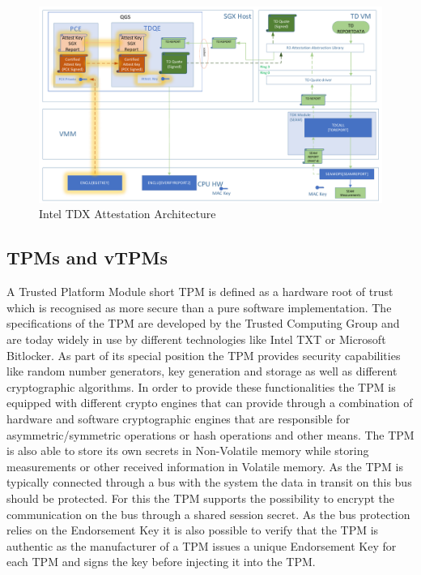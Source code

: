 \documentclass[sigplan,screen,nonacm]{acmart}
\begin{document}
\begin{figure}
  \centering
  \includegraphics[width=\linewidth]{pictures/Enclaves.png}
  \caption{Intel TDX Attestation Architecture \cite{Intel-QVL}}
  \label{fig:tdxattest}
\end{figure}


\subsection{TPMs and vTPMs}
\label{chap:TPM}
A Trusted Platform Module short TPM is defined as a hardware root of trust which is recognised as more secure than a pure software implementation\cite[p.1]{TPM}.
The specifications of the TPM are developed by the Trusted Computing Group and are today widely in use by different technologies like Intel TXT\cite[p.15]{Intel-TXT} or Microsoft Bitlocker\cite{Bitlocker}.
As part of its special position the TPM provides security capabilities like random number generators, key generation and storage as well as different cryptographic algorithms.
In order to provide these functionalities the TPM is equipped with different crypto engines that can provide through a combination of hardware and software cryptographic engines that are responsible for asymmetric/symmetric operations or hash operations and other means\cite[p. 69]{TPM-Arch}.
The TPM is also able to store its own secrets in Non-Volatile memory while storing measurements or other received information in Volatile memory\cite[p. 69]{TPM-Arch}.
As the TPM is typically connected through a bus with the system the data in transit on this bus should be protected.
For this the TPM supports the possibility to encrypt the communication on the bus through a shared session secret\cite[p. 11]{TPM-Mitigation}.
As the bus protection relies on the Endorsement Key it is also possible to verify that the TPM is authentic as the manufacturer of a TPM issues a unique Endorsement Key for each TPM and signs the key before injecting it into the TPM.
\end{document}
